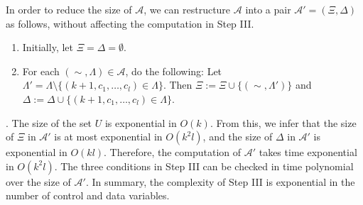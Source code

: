 In order to reduce the size of $\mathscr{A}$, we can restructure $\mathscr{A}$ into a pair $\mathscr{A}'=(\Xi, \Delta)$ as follows, without affecting the computation in Step III.
\begin{enumerate}
\item Initially, let $\Xi = \Delta = \emptyset$.
\item For each $(\sim, \Lambda) \in \mathscr{A}$, do the following: Let $\Lambda' = \Lambda \setminus \{(k+1, c_1, \dots, c_l) \in \Lambda\}$. Then $\Xi := \Xi \cup \{(\sim, \Lambda')\}$ and $\Delta:= \Delta \cup \{(k+1,c_1,\dots, c_l) \in \Lambda\}$.
\end{enumerate}

. The size of the set $U$ is exponential in $O(k)$. From this, we infer that the size of $\Xi$ in $\mathscr{A}'$ is at most exponential in $O(k^2l)$, and the size of $\Delta$ in $\mathscr{A}'$ is exponential in $O(kl)$. Therefore, the computation of $\mathscr{A}'$ takes time exponential in $O(k^2l)$. The three conditions in Step III can be checked in time polynomial over the size of $\mathscr{A}'$. In summary, the complexity of Step III is exponential in the number of control and data variables.

